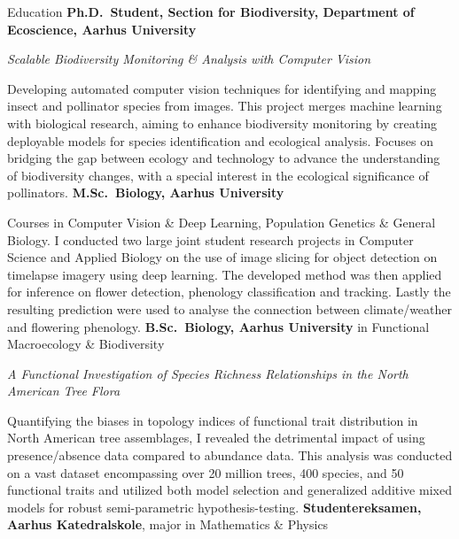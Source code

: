 \begin{rubric}{Education}
\entry*[2023 -- \ldots]
    \textbf{Ph.D.~Student, Section for Biodiversity, Department of Ecoscience, Aarhus University}\par
    \emph{Scalable Biodiversity Monitoring \& Analysis with Computer Vision}\par
    \pind Developing automated computer vision techniques for identifying and mapping insect and pollinator species from images. This project merges machine learning with biological research, aiming to enhance biodiversity monitoring by creating deployable models for species identification and ecological analysis. Focuses on bridging the gap between ecology and technology to advance the understanding of biodiversity changes, with a special interest in the ecological significance of pollinators.
%
\entry*[2022 -- 2025]%
	\textbf{M.Sc.~Biology, Aarhus University}\par
    \pind Courses in Computer Vision \& Deep Learning, Population Genetics \& General Biology. I conducted two large joint student research projects in Computer Science and Applied Biology on the use of image slicing for object detection on timelapse imagery using deep learning. The developed method was then applied for inference on flower detection, phenology classification and tracking. Lastly the resulting prediction were used to analyse the connection between climate/weather and flowering phenology.
%
\entry*[2019 -- 2022]%
	\textbf{B.Sc.~Biology, Aarhus University} in Functional Macroecology \& Biodiversity\par
	\emph{A Functional Investigation of Species Richness Relationships in the North American Tree Flora}\par
    \pind Quantifying the biases in topology indices of functional trait distribution in North American tree assemblages, I revealed the detrimental impact of using presence/absence data compared to abundance data. This analysis was conducted on a vast dataset encompassing over 20 million trees, 400 species, and 50 functional traits and utilized both model selection and generalized additive mixed models for robust semi-parametric hypothesis-testing.
%
\entry*[2015 -- 2018]%
    \textbf{Studentereksamen, Aarhus Katedralskole}, major in Mathematics \& Physics\par
%
\end{rubric}